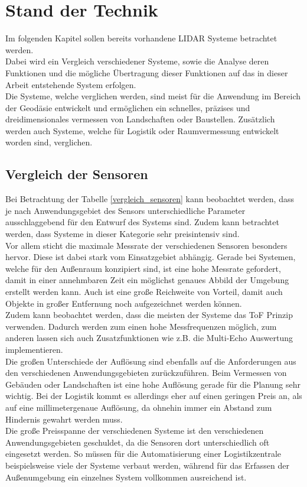 \chapter{Stand der Technik}\label{chap:stand_der_technik}
Im folgenden Kapitel sollen bereits vorhandene \ac{LIDAR} Systeme betrachtet werden.\\
Dabei wird ein Vergleich verschiedener Systeme, sowie die Analyse deren Funktionen und die mögliche Übertragung dieser Funktionen auf das in dieser Arbeit entstehende System erfolgen.\\
Die Systeme, welche verglichen werden, sind meist für die Anwendung im Bereich der Geodäsie entwickelt und ermöglichen ein schnelles, präzises und dreidimensionales vermessen von Landschaften oder Baustellen. Zusätzlich werden auch Systeme, welche für Logistik oder Raumvermessung entwickelt worden sind, verglichen. \\

\section{Vergleich der Sensoren}
Bei Betrachtung der Tabelle \ref{vergleich_sensoren} kann beobachtet werden, dass je nach Anwendungsgebiet des Sensors unterschiedliche Parameter ausschlaggebend für den Entwurf des Systems sind. Zudem kann betrachtet werden, dass Systeme in dieser Kategorie sehr preisintensiv sind. \\
Vor allem sticht die maximale Messrate der verschiedenen Sensoren besonders hervor. Diese ist dabei stark vom Einsatzgebiet abhängig. Gerade bei Systemen, welche für den Außenraum konzipiert sind, ist eine hohe Messrate gefordert, damit in einer annehmbaren Zeit ein möglichst genaues Abbild der Umgebung erstellt werden kann. Auch ist eine große Reichweite von Vorteil, damit auch Objekte in großer Entfernung noch aufgezeichnet werden können. \\
Zudem kann beobachtet werden, dass die meisten der Systeme das \ac{ToF} Prinzip verwenden. Dadurch werden zum einen hohe Messfrequenzen möglich, zum anderen lassen sich auch Zusatzfunktionen wie z.B. die Multi-Echo Auswertung implementieren. \\
\newpage
Die großen Unterschiede der Auflösung sind ebenfalls auf die Anforderungen aus den verschiedenen Anwendungsgebieten zurückzuführen. Beim Vermessen von Gebäuden oder Landschaften ist eine hohe Auflösung gerade für die Planung sehr wichtig. Bei der Logistik kommt es allerdings eher auf einen geringen Preis an, als auf eine millimetergenaue Auflösung, da ohnehin immer ein Abstand zum Hindernis gewahrt werden muss.\\
Die große Preisspanne der verschiedenen Systeme ist den verschiedenen Anwendungsgebieten geschuldet, da die Sensoren dort unterschiedlich oft eingesetzt werden. So müssen für die Automatisierung einer Logistikzentrale beispielsweise viele der Systeme verbaut werden, während für das Erfassen der Außenumgebung ein einzelnes System vollkommen ausreichend ist.

